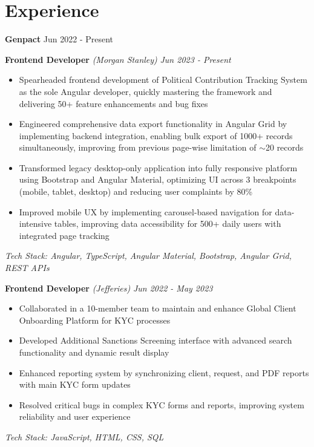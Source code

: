 \documentclass[letterpaper,11pt]{article}
\begin{document}
\section{Experience}
\textbf{Genpact} \hfill Jun 2022 - Present
\begin{itemize}[leftmargin=0.15in]
    \small{\item{
    \textbf{Frontend Developer} \textit{(Morgan Stanley)} \hfill \textit{Jun 2023 - Present}
    \begin{itemize}[leftmargin=0.15in]
        \item Spearheaded frontend development of Political Contribution Tracking System as the sole Angular developer, quickly mastering the framework and delivering 50+ feature enhancements and bug fixes
        \item Engineered comprehensive data export functionality in Angular Grid by implementing backend integration, enabling bulk export of 1000+ records simultaneously, improving from previous page-wise limitation of \(\sim \)20 records
        \item Transformed legacy desktop-only application into fully responsive platform using Bootstrap and Angular Material, optimizing UI across 3 breakpoints (mobile, tablet, desktop) and reducing user complaints by 80\%
        \item Improved mobile UX by implementing carousel-based navigation for data-intensive tables, improving data accessibility for 500+ daily users with integrated page tracking
    \end{itemize}
    \textit{Tech Stack: Angular, TypeScript, Angular Material, Bootstrap, Angular Grid, REST APIs}
    }}
    
    \small{\item{
    \textbf{Frontend Developer} \textit{(Jefferies)} \hfill \textit{Jun 2022 - May 2023}
    \begin{itemize}[leftmargin=0.15in]
        \item Collaborated in a 10-member team to maintain and enhance Global Client Onboarding Platform for KYC processes
        \item Developed Additional Sanctions Screening interface with advanced search functionality and dynamic result display
        \item Enhanced reporting system by synchronizing client, request, and PDF reports with main KYC form updates
        \item Resolved critical bugs in complex KYC forms and reports, improving system reliability and user experience
    \end{itemize}
    \textit{Tech Stack: JavaScript, HTML, CSS, SQL}
    }}
\end{itemize}
\end{document}
